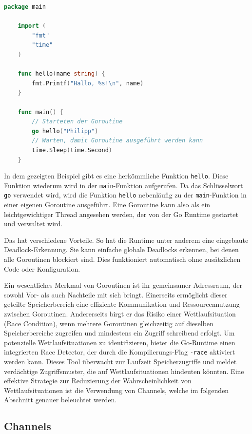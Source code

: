 \documentclass[fontsize=12pt,paper=a4,twoside=semi,parskip=half-,headsepline,headinclude]{scrreprt}
\begin{document}
\begin{lstlisting}[language=Go,extendedchars=true]
	package main
	
	import (
		"fmt"
		"time"
	)
	
	func hello(name string) {
		fmt.Printf("Hallo, %s!\n", name)
	}
	
	func main() {
		// Starteten der Goroutine
		go hello("Philipp")
		// Warten, damit Goroutine ausgeführt werden kann
		time.Sleep(time.Second)
	}
\end{lstlisting}

In dem gezeigten Beispiel gibt es eine herkömmliche Funktion \texttt{hello}. Diese Funktion wiederum wird in der \texttt{main}-Funktion aufgerufen. Da das Schlüsselwort \texttt{go} verwendet wird, wird die Funktion \texttt{hello} nebenläufig zu der \texttt{main}-Funktion in einer eigenen Goroutine ausgeführt. Eine Goroutine kann also als ein leichtgewichtiger Thread angesehen werden, der von der Go Runtime gestartet und verwaltet wird. 

Das hat verschiedene Vorteile. So hat die Runtime unter anderem eine eingebaute Dead\-lock-Erkennung. Sie kann einfache globale Deadlocks erkennen, bei denen alle Goroutinen blockiert sind. Dies funktioniert automatisch ohne zusätzlichen Code oder Konfiguration.

Ein wesentliches Merkmal von Goroutinen ist ihr gemeinsamer Adressraum, der sowohl Vor- als auch Nachteile mit sich bringt. Einerseits ermöglicht dieser geteilte Speicherbereich eine effiziente Kommunikation und Ressourcennutzung zwischen Goroutinen. Andererseits birgt er das Risiko einer Wettlaufsituation (Race Condition), wenn mehrere Goroutinen gleichzeitig auf dieselben Speicherbereiche zugreifen und mindestens ein Zugriff schreibend erfolgt. Um potenzielle Wettlaufsituationen zu identifizieren, bietet die Go-Runtime einen integrierten Race Detector\cite{DataRace2024}, der durch die Kompilierungs-Flag \texttt{-race} aktiviert werden kann. Dieses Tool überwacht zur Laufzeit Speicherzugriffe und meldet verdächtige Zugriffsmuster, die auf Wettlaufsituationen hindeuten könnten. Eine effektive Strategie zur Reduzierung der Wahrscheinlichkeit von Wettlaufsituationen ist die Verwendung von Channels, welche im folgenden Abschnitt genauer beleuchtet werden.

\subsection{Channels}
\label{subsec:channel}
\end{document}
